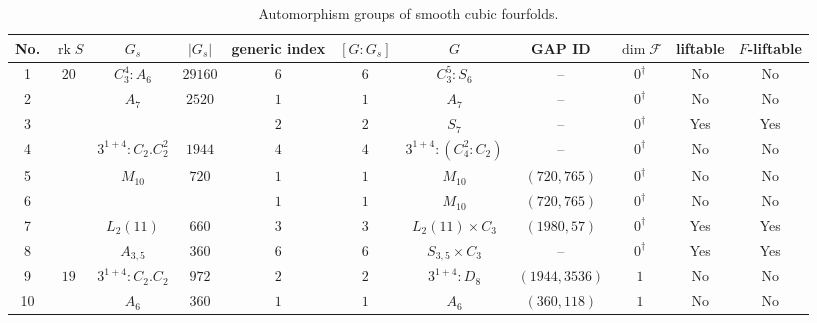 \documentclass[12pt]{amsart}
\numberwithin{equation}{section}
\theoremstyle{plain}
\theoremstyle{definition}
\theoremstyle{remark}
\begin{document}
{\scriptsize
\setlength{\tabcolsep}{1.5pt}
\begin{longtable}{|c|c|c|c|c|c|c|c|c|c|c|}
\caption{Automorphism groups of smooth cubic fourfolds.}
\label{tab:fourfold}\\
\hline
No. & $\operatorname{rk}S$                 & $G_s$                            & $|G_s|$              & generic index         & $[G:G_s]$ & \multicolumn{1}{c|}{$G$}                             & GAP ID            & $\dim\mathcal F$ & liftable & $F$-liftable \\ \hline
1 & \multirow[t]{8}{*}{$20$} & $C_3^4:A_6$ & $29160$ & $6$ & $6$ & \multicolumn{1}{c|}{$C_3^5:S_6$} & -- & $0^\dagger$ & No & No \\ \cline{1-1} \cline{3-11}
2 &  & \multirow[t]{2}{*}{$A_7$} & \multirow[t]{2}{*}{$2520$} & $1$ & $1$ & \multicolumn{1}{c|}{$A_7$} & -- & $0^\dagger$ & No & No \\ \cline{1-1} \cline{5-11}
3 &  &  &  & $2$ & $2$ & \multicolumn{1}{c|}{$S_7$} & -- & $0^\dagger$ & Yes & Yes \\ \cline{1-1} \cline{3-11}
4 &  & $3^{1+4}:C_2.C_2^2$ & $1944$ & $4$ & $4$ & \multicolumn{1}{c|}{$3^{1+4}:(C_4^2:C_2)$} & -- & $0^\dagger$ & No & No \\ \cline{1-1} \cline{3-11}
5 &  & \multirow[t]{2}{*}{$M_{10}$} & \multirow[t]{2}{*}{$720$} & $1$ & $1$ & \multicolumn{1}{c|}{$M_{10}$} & $(720,765)$ & $0^\dagger$ & No & No \\ \cline{1-1} \cline{5-11}
6 &  &  &  & $1$ & $1$ & \multicolumn{1}{c|}{$M_{10}$} & $(720,765)$ & $0^\dagger$ & No & No \\ \cline{1-1} \cline{3-11}
7 &  & $L_2(11)$ & $660$ & $3$ & $3$ & \multicolumn{1}{c|}{$L_2(11)\times C_3$} & $(1980,57)$ & $0^\dagger$ & Yes & Yes \\ \cline{1-1} \cline{3-11}
8 &  & $A_{3,5}$ & $360$ & $6$ & $6$ & \multicolumn{1}{c|}{$S_{3,5}\times C_3$} & -- & $0^\dagger$ & Yes & Yes \\ \hline
9 & \multirow[t]{12}{*}{$19$} & $3^{1+4}:C_2.C_2$ & $972$ & $2$ & $2$ & \multicolumn{1}{c|}{$3^{1+4}:D_8$} & $(1944,3536)$ & $1$ & No & No \\ \cline{1-1} \cline{3-11}
10 &  & \multirow[t]{2}{*}{$A_6$} & \multirow[t]{2}{*}{$360$} & $1$ & $1$ & \multicolumn{1}{c|}{$A_6$} & $(360,118)$ & $1$ & No & No \\ \cline{1-1} \cline{5-11}

\end{longtable}}
\end{document}
